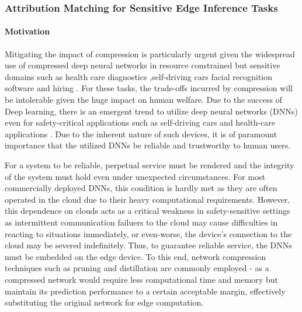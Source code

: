 \subsubsection{Attribution Matching for Sensitive Edge Inference Tasks}

\paragraph{Motivation}
Mitigating the impact of compression is particularly
urgent given the widespread use of compressed deep 
neural networks in resource constrained but sensitive 
domains such as 
%
%
%
health care diagnostics 
\cite{xie2019automated, %
gruetzemacher20183d,    %
badgeley2019deep,       %
oakden2020hidden}       %
%
%
,self-driving cars 
\cite{teslacrash17} %
%
facial recognition software
\cite{
buolamwini2018gender%
} and
%
hiring
\cite{amazon18, 
yourface19}.%
%
%
For these tasks, the trade-offs incurred by 
compression will be intolerable given the huge impact 
on human welfare.
%
Due to the success of Deep learning, there is an 
emergent trend to utilize deep neural networks (DNNs) 
even for safety-critical applications such as 
self-driving cars and health-care applications 
\cite{estava2017dermatologist,
samala2018evolutionary, lane2018deep}.
%
Due to the inherent nature of such devices, 
it is of paramount importance that the utilized 
DNNs be reliable and trustworthy to human users.
%

For a system to be reliable, perpetual service 
must be rendered and the integrity of the system 
must hold even under unexpected circumstances.
%
%
For most commercially deployed DNNs, this condition 
is hardly met as they are often operated in the 
cloud due to their heavy computational requirements.
%
%
However, this dependence on clouds acts as a 
critical weakness in safety-sensitive settings 
as intermittent communication failuers to the 
cloud may cause difficulties in reacting to 
situations immediately, or even-worse, 
the device's connection to the cloud may be 
severed indefinitely.
%
%
Thus, to guarantee reliable service, 
the DNNs must be embedded on the edge device.
%
%
%
To this end, network compression techniques such 
as pruning \cite{han2015deep,li2016pruning} and distillation \cite{hinton2015distilling,zagoruyko2016paying} 
are commonly employed - as a compressed network 
would require less computational time and memory 
but maintain its prediction performance to a 
certain acceptable margin, effectively substituting 
the original network for edge computation.

